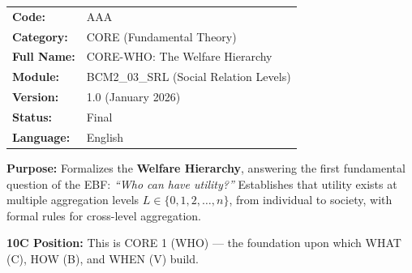 %
%
%


\begin{tcolorbox}[colback=gray!5!white, colframe=gray!75!black,
    title=Appendix Header: AAA CORE-WHO]

\begin{tabular}{@{}ll@{}}
\textbf{Code:} & AAA \\
\textbf{Category:} & CORE (Fundamental Theory) \\
\textbf{Full Name:} & CORE-WHO: The Welfare Hierarchy \\
\textbf{Module:} & BCM2\_03\_SRL (Social Relation Levels) \\
\textbf{Version:} & 1.0 (January 2026) \\
\textbf{Status:} & Final \\
\textbf{Language:} & English \\
\end{tabular}

\vspace{0.5em}
\textbf{Purpose:} Formalizes the \textbf{Welfare Hierarchy}, answering the
first fundamental question of the EBF: \textit{``Who can have utility?''}
Establishes that utility exists at multiple aggregation levels $L \in \{0, 1, 2, \ldots, n\}$,
from individual to society, with formal rules for cross-level aggregation.

\textbf{10C Position:} This is CORE 1 (WHO) --- the foundation upon which
WHAT (C), HOW (B), and WHEN (V) build.

\end{tcolorbox}


